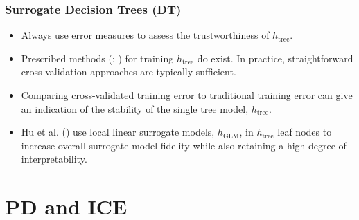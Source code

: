 \documentclass[11pt,
               aspectratio=169
               ]{beamer}
\begin{document}
		\begin{frame}
		
			\frametitle{Surrogate Decision Trees (DT)}
			
			\begin{itemize}
				
				\item Always use error measures to assess the trustworthiness of $h_{\text{tree}}$.
	
				\item Prescribed methods (\cite{dt_surrogate1}; \cite{dt_surrogate2}) for training $h_{\text{tree}}$ do exist. In practice, straightforward cross-validation approaches are typically sufficient. 
				
				\item Comparing cross-validated training error to traditional training error can give an indication of the stability of the single tree model, $h_{\text{tree}}$.
				
				\item Hu et al. (\citeyear{lime-sup}) use local linear surrogate models, $h_{\text{GLM}}$, in $h_{\text{tree}}$ leaf nodes to increase overall surrogate model fidelity while also retaining a high degree of interpretability.
				
			\end{itemize}
			
		\end{frame}

	\section{PD and ICE}
\end{document}
